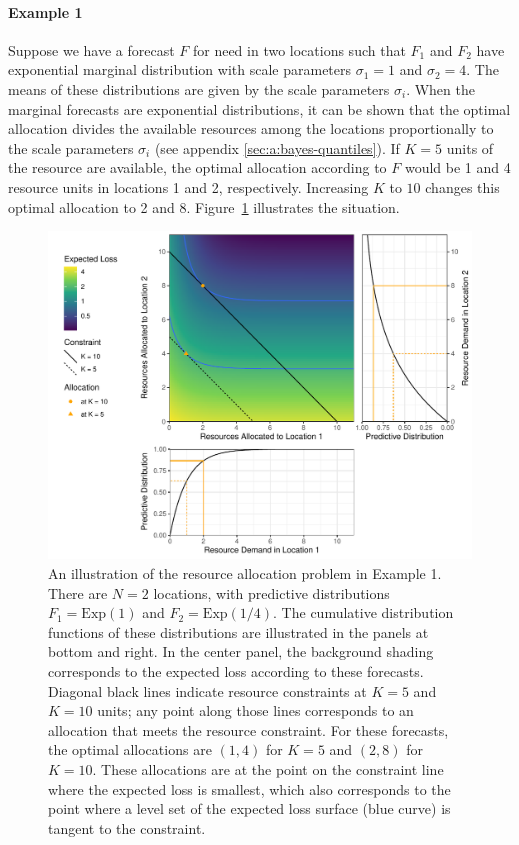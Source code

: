 \documentclass{article}\usepackage[]{graphicx}\usepackage[]{xcolor}
\begin{document}
\paragraph{Example 1} Suppose we have a forecast $F$ for need in two locations such that $F_1$ and $F_2$ have exponential marginal distribution with scale parameters $\sigma_1 = 1$ and $\sigma_2 = 4$. The means of these distributions are
given by the scale parameters $\sigma_i$. When the marginal forecasts are exponential distributions, it can be shown
that the optimal allocation divides the available resources among the locations proportionally to the scale parameters
$\sigma_i$ (see appendix \ref{sec:a:bayes-quantiles}). If $K = 5$ units of the resource are
available, the optimal allocation according to $F$ would be 1 and 4 resource units in locations 1 and 2, respectively. 
Increasing $K$ to $10$ changes this optimal allocation to 2 and 8. Figure~\ref{fig:exp_alloc_example} illustrates the 
situation.

\begin{figure}
    \includegraphics[width=\textwidth]{../figures/exponential_pred_expected_loss.pdf}
    \caption{An illustration of the resource allocation problem in Example 1. There are $N = 2$ locations, with
    predictive distributions $F_1 = \mathrm{Exp}(1)$ and $F_2 = \mathrm{Exp}(1/4)$. The cumulative distribution
    functions of these distributions are illustrated in the panels at bottom and right. In the center panel, the
    background shading corresponds to the expected loss according to these forecasts. Diagonal black lines indicate
    resource constraints at $K=5$ and $K=10$ units; any point along those lines corresponds to an allocation that meets
    the resource constraint. For these forecasts, the optimal allocations are $(1, 4)$ for $K=5$ and $(2, 8)$ for
    $K=10$. These allocations are at the point on the constraint line where the expected loss is smallest, which also
    corresponds to the point where a level set of the expected loss surface (blue curve) is tangent to the constraint.}
    \label{fig:exp_alloc_example}
\end{figure}
\end{document}
